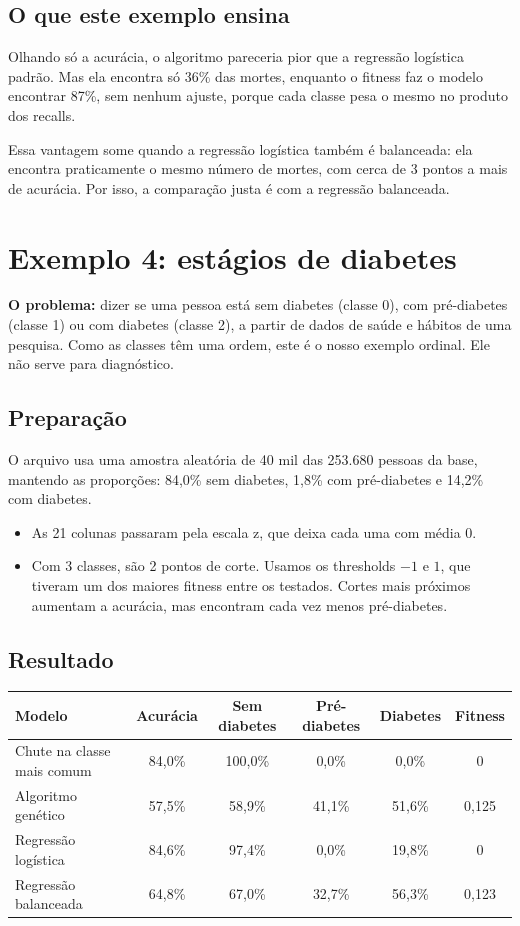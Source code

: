 \documentclass[11pt,a4paper]{article}
\newcommand{\code}[1]{\texttt{\detokenize{#1}}}
\newenvironment{tabela}{\par\nopagebreak[4]\vspace{0.3em}\nopagebreak[4]\begingroup\centering\small}{\par\endgroup\vspace{0.6em}}
\begin{document}
\subsection{O que este exemplo ensina}

Olhando só a acurácia, o algoritmo pareceria pior que a regressão logística padrão. Mas ela encontra só 36\% das mortes, enquanto o fitness faz o modelo encontrar 87\%, sem nenhum ajuste, porque cada classe pesa o mesmo no produto dos recalls.

Essa vantagem some quando a regressão logística também é balanceada: ela encontra praticamente o mesmo número de mortes, com cerca de 3 pontos a mais de acurácia. Por isso, a comparação justa é com a regressão balanceada.

\clearpage
\section{Exemplo 4: estágios de diabetes}

\textbf{O problema:} dizer se uma pessoa está sem diabetes (classe 0), com pré-diabetes (classe 1) ou com diabetes (classe 2), a partir de dados de saúde e hábitos de uma pesquisa. Como as classes têm uma ordem, este é o nosso exemplo ordinal. Ele não serve para diagnóstico.

\subsection{Preparação}

O arquivo \code{dados_diabetes.xlsx} usa uma amostra aleatória de 40 mil das 253.680 pessoas da base, mantendo as proporções: 84,0\% sem diabetes, 1,8\% com pré-diabetes e 14,2\% com diabetes.

\begin{itemize}
  \item As 21 colunas passaram pela escala z, que deixa cada uma com média 0.
  \item Com 3 classes, são 2 pontos de corte. Usamos os thresholds $-1$ e $1$, que tiveram um dos maiores fitness entre os testados. Cortes mais próximos aumentam a acurácia, mas encontram cada vez menos pré-diabetes.
\end{itemize}

\subsection{Resultado}

\begin{tabela}
\begin{tabular}{lccccc}
\toprule
Modelo & Acurácia & Sem diabetes & Pré-diabetes & Diabetes & Fitness\\
\midrule
Chute na classe mais comum & 84,0\% & 100,0\% & 0,0\% & 0,0\% & 0\\
Algoritmo genético & 57,5\% & 58,9\% & 41,1\% & 51,6\% & 0,125\\
Regressão logística & 84,6\% & 97,4\% & 0,0\% & 19,8\% & 0\\
Regressão balanceada & 64,8\% & 67,0\% & 32,7\% & 56,3\% & 0,123\\
\bottomrule
\end{tabular}
\end{tabela}
\end{document}
